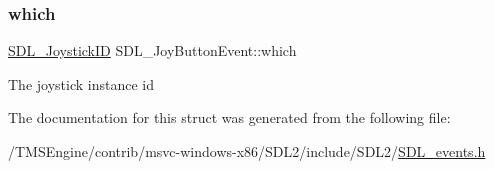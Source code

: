 \subsubsection{\texorpdfstring{which}{which}}
{\footnotesize\ttfamily \hyperlink{_s_d_l__joystick_8h_a3c3d32500cb08f76ee8077983912c0bd}{S\+D\+L\+\_\+\+Joystick\+ID} S\+D\+L\+\_\+\+Joy\+Button\+Event\+::which}

The joystick instance id 

The documentation for this struct was generated from the following file\+:\begin{DoxyCompactItemize}
\item 
/\+T\+M\+S\+Engine/contrib/msvc-\/windows-\/x86/\+S\+D\+L2/include/\+S\+D\+L2/\hyperlink{_s_d_l__events_8h}{S\+D\+L\+\_\+events.\+h}\end{DoxyCompactItemize}
